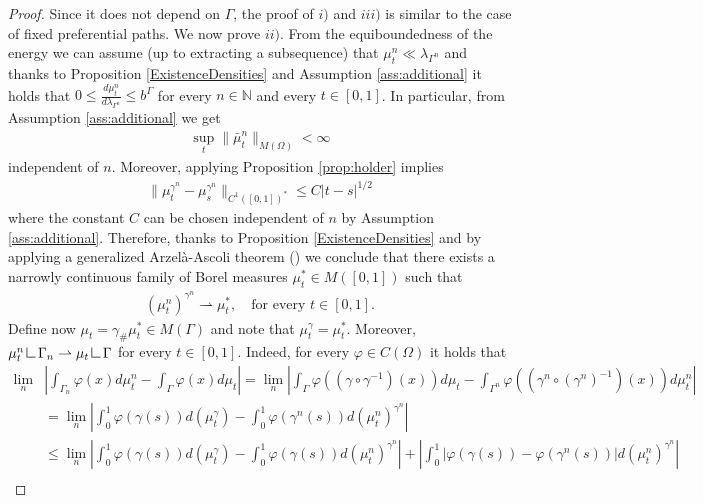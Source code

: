 \documentclass{article}
\newcommand{\res}{\mathop{\hbox{\vrule height 7pt width .5pt depth 0pt
\vrule height .5pt width 6pt depth 0pt}}\nolimits}
\begin{document}
\begin{proof}
    Since it does not depend on $\Gamma$, the proof of $i)$ and $iii)$ is similar to the case of fixed preferential paths. We now prove $ii)$. From the equiboundedness of the energy we can assume (up to extracting a subsequence) that $\mu^n_t \ll \lambda_{\Gamma^n}$  and thanks to Proposition \ref{ExistenceDensities} and Assumption \ref{ass:additional} it holds that $0 \leq \frac{d\mu^n_t}{d\lambda_{\Gamma^n}} \leq b^{\Gamma}$ for every $n\in \mathbb{N}$ and every $t \in [0,1]$. In particular, from Assumption \ref{ass:additional} we get
    \begin{align}
        \sup_{t} \|\bar \mu_t^n \|_{M(\Omega)} < \infty
    \end{align}
    independent of $n$. Moreover, applying Proposition \ref{prop:holder} implies 
    \begin{align}
        \|\mu_t^{\gamma^n} - \mu_s^{\gamma^n}\|_{C^1([0,1])^*} \leq C|t-s|^{1/2}
    \end{align}
    where the constant $C$ can be chosen independent of $n$ by Assumption \ref{ass:additional}.
  Therefore, thanks to Proposition \ref{ExistenceDensities} and by applying a generalized Arzelà-Ascoli theorem (\cite[Proposition A.4]{bredies2020optimal}) we conclude that there exists a narrowly continuous family of Borel measures $\mu^*_t \in M([0,1])$ such that 
     \begin{align}\label{eq:convweak}
     (\mu^n_t)^{\gamma^n} \rightharpoonup \mu^*_t, \quad \text{for every } t \in [0,1].  
     \end{align}
     Define now $\mu_t = \gamma_\# \mu^*_t \in M(\Gamma)$ and note that $\mu_t^\gamma = \mu^*_t$. Moreover, $\mu_t^n \res \Gamma_n \rightharpoonup \mu_t \res \Gamma$ for every $t \in [0,1]$. Indeed, for every $\varphi \in C(\Omega)$ it holds that 
    \begin{align*}
        \lim_n &  \left|\int_{\Gamma_n} \varphi(x) d\mu^n_t - \int_{\Gamma} \varphi(x) d\mu_t\right| = \lim_n \left| \int_{\Gamma} \varphi((\gamma \circ \gamma^{-1})(x)) d\mu_t - \int_{\Gamma^n} \varphi((\gamma^n \circ (\gamma^n)^{-1})(x)) d\mu^n_t\right|\\
        & = \lim_n\left| \int_0^1 \varphi(\gamma(s)) d(\mu^{\gamma}_t) - \int_0^1 \varphi(\gamma^n(s)) d(\mu_t^n)^{\gamma^n}\right| \\
        & \leq \lim_n\left| \int_0^1 \varphi(\gamma(s)) d(\mu^{\gamma}_t) - \int_0^1 \varphi(\gamma(s)) d(\mu_t^n)^{\gamma^n}\right| + \left| \int_0^1 |\varphi(\gamma(s)) - \varphi(\gamma^n(s))| d(\mu_t^n)^{\gamma^n}\right| \\

\end{align*}
\end{proof}
\end{document}
